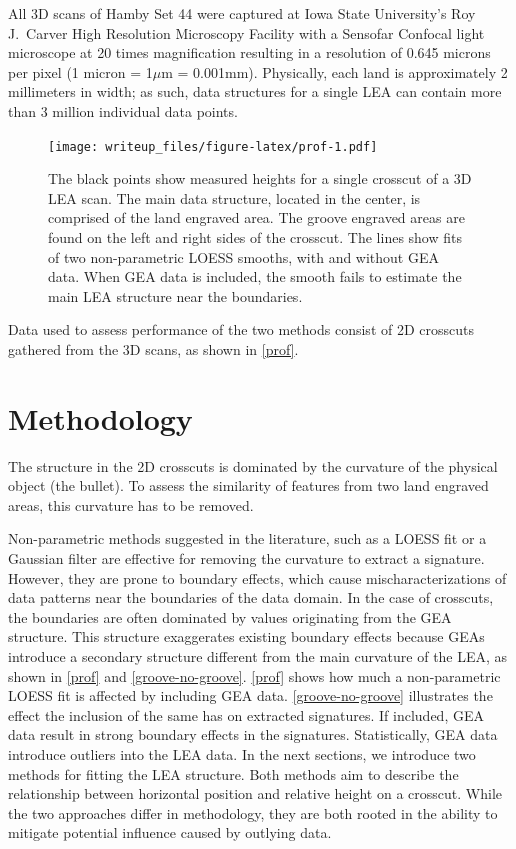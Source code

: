 \documentclass[12pt]{article}
\begin{document}
All 3D scans of Hamby Set 44 were captured at Iowa State University's
Roy J.~Carver High Resolution Microscopy Facility with a Sensofar
Confocal light microscope at 20 times magnification resulting in a
resolution of 0.645 microns per pixel (1 micron = 1\(\mu\)m = 0.001mm).
Physically, each land is approximately 2 millimeters in width; as such,
data structures for a single LEA can contain more than 3 million
individual data points.

\begin{figure}
\centering
\texttt{[image: writeup\_files/figure-latex/prof-1.pdf]}
\caption{\label{prof}The black points show measured heights for a single
crosscut of a 3D LEA scan. The main data structure, located in the
center, is comprised of the land engraved area. The groove engraved
areas are found on the left and right sides of the crosscut. The lines
show fits of two non-parametric LOESS smooths, with and without GEA
data. When GEA data is included, the smooth fails to estimate the main
LEA structure near the boundaries.}
\end{figure}

Data used to assess performance of the two methods consist of 2D
crosscuts gathered from the 3D scans, as shown in \autoref{prof}.

\section{Methodology}

The structure in the 2D crosscuts is dominated by the curvature of the
physical object (the bullet). To assess the similarity of features from
two land engraved areas, this curvature has to be removed.

Non-parametric methods suggested in the literature, such as a LOESS fit
\citep{Hare1} or a Gaussian filter \citep{Chu1} are effective for
removing the curvature to extract a signature. However, they are prone
to boundary effects, which cause mischaracterizations of data patterns
near the boundaries of the data domain. In the case of crosscuts, the
boundaries are often dominated by values originating from the GEA
structure. This structure exaggerates existing boundary effects because
GEAs introduce a secondary structure different from the main curvature
of the LEA, as shown in \autoref{prof} and \autoref{groove-no-groove}.
\autoref{prof} shows how much a non-parametric LOESS fit is affected by
including GEA data. \autoref{groove-no-groove} illustrates the effect
the inclusion of the same has on extracted signatures. If included, GEA
data result in strong boundary effects in the signatures. Statistically,
GEA data introduce outliers into the LEA data. In the next sections, we
introduce two methods for fitting the LEA structure. Both methods aim to
describe the relationship between horizontal position and relative
height on a crosscut. While the two approaches differ in methodology,
they are both rooted in the ability to mitigate potential influence
caused by outlying data.
\end{document}
